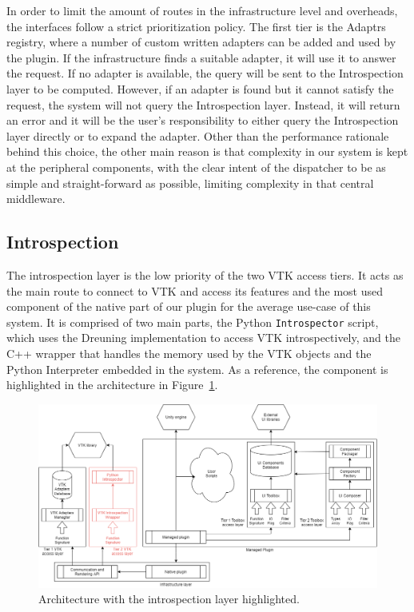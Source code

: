 In order to limit the amount of routes in the infrastructure level and overheads, the interfaces follow a strict prioritization policy. The first tier is the Adaptrs registry, where a number of custom written adapters can be added and used by the plugin. If the infrastructure finds a suitable adapter, it will use it to answer the request. If no adapter is available, the query will be sent to the Introspection layer to be computed. However, if an adapter is found but it cannot satisfy the request, the system will not query the Introspection layer. Instead, it will return an error and it will be the user's responsibility to either query the Introspection layer directly or to expand the adapter. Other than the performance rationale behind this choice, the other main reason is that complexity in our system is kept at the peripheral components, with the clear intent of the dispatcher to be as simple and straight-forward as possible, limiting complexity in that central middleware.

\subsection{Introspection}
\label{sec:design-introspection}

The introspection layer is the low priority of the two VTK access tiers. It acts as the main route to connect to VTK and access its features and the most used component of the native part of our plugin for the average use-case of this system. It is comprised of two main parts, the Python \verb|Introspector| script, which uses the Dreuning implementation to access VTK introspectively, and the C++ wrapper that handles the memory used by the VTK objects and the Python Interpreter embedded in the system. As a reference, the component is highlighted in the architecture in Figure~\ref{fig:arch-intro}.

\begin{figure}[!t]
    \centering
    \includegraphics[width=\textwidth]{pictures/Architecture-v0.3-intro.png}
    \caption{Architecture with the introspection layer highlighted.}
    \label{fig:arch-intro}
\end{figure}

